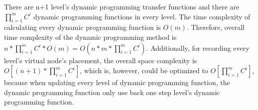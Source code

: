 There are n+1 level's dynamic programming  transfer functions and there are $\prod_{i=1}^{m}C^i$ dynamic programming functions in every level. The time complexity of calculating every dynamic programming function is $O(m)$. Therefore, overall time complexity of the dynamic programming method is $n*\prod_{i=1}^{m}C^i*O(m)=O(n*m*\prod_{i=1}^{m}C^i)$. Additionally, for recording every level's virtual node's placement, the overall space complexity is $O[(n+1)*\prod_{i=1}^{m}C^i]$, which is, however, could be optimized to $O[\prod_{i=1}^{m}C^i]$, because when updating every level of dynamic programming function, the dynamic programming function only use back one step level's dynamic programming function.


